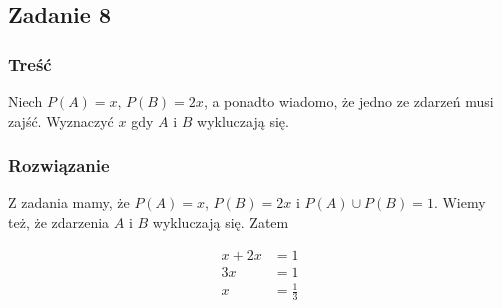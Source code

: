 \subsection{Zadanie 8}

\subsubsection*{Treść}
Niech $P(A)=x$, $P(B)=2x$, a ponadto wiadomo, że jedno ze zdarzeń musi zajść. Wyznaczyć $x$ gdy $A$ i $B$ wykluczają się.


\subsubsection*{Rozwiązanie}
Z zadania mamy, że $P(A) = x$, $P(B) = 2x$ i $P(A) \cup P(B) = 1$.
Wiemy też, że zdarzenia $A$ i $B$ wykluczają się. Zatem

\begin{align*}
x + 2x &= 1 \\
3x &= 1 \\
x &= \frac{1}{3}
\end{align*}

